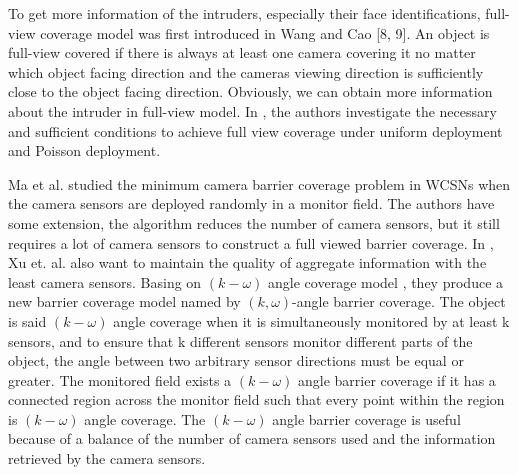 \documentclass[3p]{elsarticle}
\begin{document}
%
To get more information of the intruders, especially their face identifications, full-view coverage model was first introduced in Wang and Cao [8, 9]. An object is full-view covered if there is always at least one camera covering it no matter which object facing direction and the cameras viewing direction is sufficiently close to the object facing direction. Obviously, we can obtain more information about the intruder in full-view model. In \cite{wu2012achieving}, the authors investigate the necessary and sufficient conditions to achieve full view coverage under uniform deployment and Poisson deployment. \par
%
Ma et al. \cite{ma2012minimum} studied the minimum camera barrier coverage problem in WCSNs when the camera sensors are deployed randomly in a monitor field. The authors have some extension, the algorithm reduces the number of camera sensors, but it still requires a lot of camera sensors to construct a full viewed barrier coverage. In \cite{xu2016minimum}, Xu et. al. also want to maintain the quality of aggregate information with the least camera sensors. Basing on $(k-\omega)$ angle coverage model \cite{tseng2012k}, they produce a new barrier coverage model named by $(k, \omega)$-angle barrier coverage. The object is said $(k-\omega)$ angle coverage when it is simultaneously monitored by at least k sensors, and to ensure that k different sensors monitor different parts of the object, the angle between two arbitrary sensor directions must be equal or greater. The monitored field exists a $(k-\omega)$ angle barrier coverage if it has a connected region across the monitor field such that every point within the region is $(k-\omega)$ angle coverage. The $(k-\omega)$ angle barrier coverage is useful because of a balance of the number of camera sensors used and the information retrieved by the camera sensors.\par
%
\end{document}
